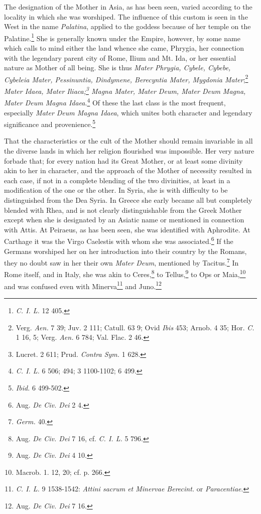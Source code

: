 \documentclass[a4paper, 11pt, oneside, polutonikogreek, english]{article}
\begin{document}
The designation of the Mother in Asia, as has been seen, varied according to the locality in which she was worshiped. The influence of this custom is seen in the West in the name \emph{Palatina}, applied to the goddess because of her temple on the Palatine.\footnote{\emph{C. I. L.} 12 405.} She is generally known under the Empire, however, by some name which calls to mind either the land whence she came, Phrygia, her connection with the legendary parent city of Rome, Ilium and Mt. Ida, or her essential nature as Mother of all being. She is thus \emph{Mater Phrygia, Cybele, Cybebe, Cybeleia Mater, Pessinuntia, Dindymene, Berecyntia Mater, Mygdonia Mater};\footnote{Verg. \emph{Aen.} 7 39; Juv. 2 111; Catull. 63 9; Ovid \emph{Ibis} 453; Arnob. 4 35; Hor. \emph{C.} 1 16, 5; Verg. \emph{Aen.} 6 784; Val. Flac. 2 46.} \emph{Mater Idaea, Mater Iliaca;\footnote{Lucret. 2 611; Prud. \emph{Contra Sym.} 1 628.} Magna Mater, Mater Deum, Mater Deum Magna, Mater Deum Magna Idaea}.\footnote{\emph{C. I. L.} 6 506; 494; 3 1100-1102; 6 499.} Of these the last class is the most frequent, especially \emph{Mater Deum Magna Idaea}, which unites both character and legendary significance and provenience.\footnote{\emph{Ibid.} 6 499-502.}

That the characteristics or the cult of the Mother should remain invariable in all the diverse lands in which her religion flourished was impossible. Her very nature forbade that; for every nation had its Great Mother, or at least some divinity akin to her in character, and the approach of the Mother of necessity resulted in each case, if not in a complete blending of the two divinities, at least in a modification of the one or the other. In Syria, she is with difficulty to be distinguished from the Dea Syria. In Greece she early became all but completely blended with Rhea, and is not clearly distinguishable from the Greek Mother except when she is designated by an Asiatic name or mentioned in connection with Attis. At Peiraeus, as has been seen, she was identified with Aphrodite. At Carthage it was the Virgo Caelestis with whom she was associated.\footnote{Aug. \emph{De Civ. Dei} 2 4.} If the Germans worshiped her on her introduction into their country by the Romans, they no doubt saw in her their own \emph{Mater Deum}, mentioned by Tacitus.\footnote{\emph{Germ.} 40.} In Rome itself, and in Italy, she was akin to Ceres,\footnote{Aug. \emph{De Civ. Dei} 7 16, cf. \emph{C. I. L.} 5 796.} to Tellus,\footnote{Aug. \emph{De Civ. Dei} 4 10.} to Ops or Maia,\footnote{Macrob. 1. 12, 20; cf. p. 266.} and was confused even with Minerva\footnote{\emph{C. I. L.} 9 1538-1542: \emph{Attini sacrum et Minervae Berecint.} or \emph{Paracentiae}.} and Juno.\footnote{Aug. \emph{De Civ. Dei} 7 16.}
\end{document}
